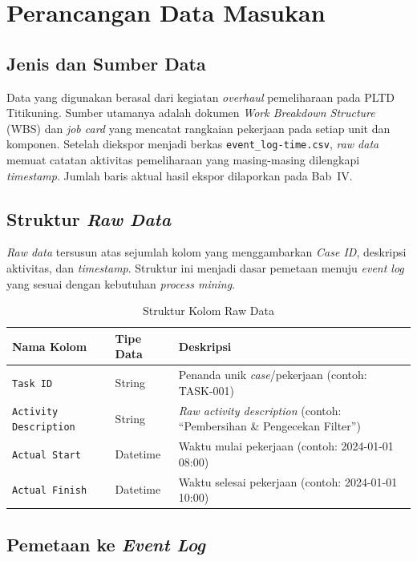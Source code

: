 \section{Perancangan Data Masukan}

\subsection{Jenis dan Sumber Data}

Data yang digunakan berasal dari kegiatan \textit{overhaul} pemeliharaan pada PLTD Titikuning. Sumber utamanya adalah dokumen \textit{Work Breakdown Structure} (WBS) dan \textit{job card} yang mencatat rangkaian pekerjaan pada setiap unit dan komponen. Setelah diekspor menjadi berkas \texttt{event\_log-time.csv}, \textit{raw data} memuat catatan aktivitas pemeliharaan yang masing-masing dilengkapi \textit{timestamp}. Jumlah baris aktual hasil ekspor dilaporkan pada Bab~IV.

\subsection{Struktur \textit{Raw Data}}

\textit{Raw data} tersusun atas sejumlah kolom yang menggambarkan \textit{Case ID}, deskripsi aktivitas, dan \textit{timestamp}. Struktur ini menjadi dasar pemetaan menuju \textit{event log} yang sesuai dengan kebutuhan \textit{process mining}.

\begin{table}[H]
\centering
\caption{Struktur Kolom Raw Data}
\label{tab:struktur-data-mentah}
\footnotesize
\begin{tabularx}{\textwidth}{p{3.5cm} p{2cm} X}
\toprule
\textbf{Nama Kolom} & \textbf{Tipe Data} & \textbf{Deskripsi} \\
\midrule
\texttt{Task ID} & String & Penanda unik \textit{case}/pekerjaan (contoh: TASK-001) \\
\texttt{Activity Description} & String & \textit{Raw activity description} (contoh: ``Pembersihan \& Pengecekan Filter'') \\
\texttt{Actual Start} & Datetime & Waktu mulai pekerjaan (contoh: 2024-01-01 08:00) \\
\texttt{Actual Finish} & Datetime & Waktu selesai pekerjaan (contoh: 2024-01-01 10:00) \\
\bottomrule
\end{tabularx}
\end{table}

\subsection{Pemetaan ke \textit{Event Log}}

